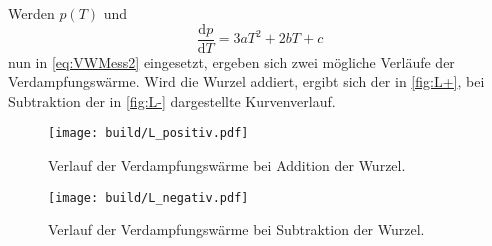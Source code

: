 Werden $p(T)$ und 
\begin{equation*}
  \frac{\mathrm{d}p}{\mathrm{d}T} = 3 a T^2 + 2 b T + c
\end{equation*} nun in \eqref{eq:VWMess2} eingesetzt, ergeben sich zwei mögliche Verläufe der 
Verdampfungswärme.
Wird die Wurzel addiert, ergibt sich der in \autoref{fig:L+}, bei Subtraktion der
in \autoref{fig:L-} dargestellte Kurvenverlauf.

\begin{figure}
  \centering
  \texttt{[image: build/L\_positiv.pdf]}
  \caption{Verlauf der Verdampfungswärme bei Addition der Wurzel.}
  \label{fig:L+}
\end{figure}

\begin{figure}
  \centering
  \texttt{[image: build/L\_negativ.pdf]}
  \caption{Verlauf der Verdampfungswärme bei Subtraktion der Wurzel.}
  \label{fig:L-}
\end{figure}





